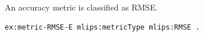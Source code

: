 An accuracy metric is classified as RMSE.
\begin{lstlisting}[language=turtle]
ex:metric-RMSE-E mlips:metricType mlips:RMSE .
\end{lstlisting}
